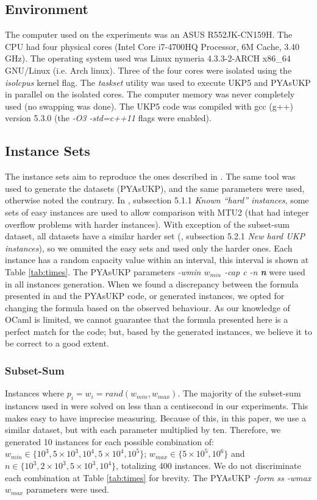 \documentclass[runningheads,a4paper]{llncs}
\begin{document}
\subsection{Environment}

The computer used on the experiments was an ASUS R552JK-CN159H. The CPU had four physical cores (Intel Core i7-4700HQ Processor, 6M Cache, 3.40 GHz). The operating system used was Linux nymeria 4.3.3-2-ARCH x86\_64 GNU/Linux (i.e. Arch linux). Three of the four cores were isolated using the \emph{isolcpus} kernel flag. The \emph{taskset} utility was used to execute UKP5 and PYAsUKP in parallel on the isolated cores. The computer memory was never completely used (no swapping was done). The UKP5 code was compiled with gcc (g++) version 5.3.0 (the \emph{-O3 -std=c++11} flags were enabled).

\subsection{Instance Sets}

The instance sets aim to reproduce the ones described in \cite{pya}. The same tool was used to generate the datasets (PYAsUKP), and the same parameters were used, otherwise noted the contrary. In \cite{pya}, subsection 5.1.1 \emph{Known ``hard'' instances}, some sets of easy instances are used to allow comparison with MTU2 (that had integer overflow problems with harder instances). With exception of the subset-sum dataset, all datasets have a similar harder set (\cite{pya}, subsection 5.2.1 \emph{New hard UKP instances}), so we ommited the easy sets and used only the harder ones. Each instance has a random capacity value within an interval, this interval is shown at Table \ref{tab:times}. The PYAsUKP parameters \emph{-wmin \(w_{min}\) -cap c -n \textbf{n}} were used in all instances generation. When we found a discrepancy between the formula presented in \cite{pya} and the PYAsUKP code, or generated instances, we opted for changing the formula based on the observed behaviour. As our knowledge of OCaml is limited, we cannot guarantee that the formula presented here is a perfect match for the code; but, based by the generated instances, we believe it to be correct to a good extent.

\subsubsection{Subset-Sum}\label{sec:subsetsum}
Instances where \(p_i = w_i = rand(w_{min}, w_{max})\). The majority of the subset-sum instances used in \cite{pya} were solved on less than a centisecond in our experiments. This makes easy to have imprecise measuring. Because of this, in this paper, we use a similar dataset, but with each parameter multiplied by ten. Therefore, we generated 10 instances for each possible combination of: \(w_{min} \in \{10^3, 5\times10^3, 10^4, 5\times10^4, 10^5\}\); \(w_{max} \in \{5\times10^5, 10^6\}\) and \(n \in \{10^3, 2\times10^3, 5\times10^3, 10^4\}\), totalizing 400 instances. We do not discriminate each combination at Table \ref{tab:times} for brevity. The PYAsUKP \emph{-form ss -wmax \(w_{max}\)} parameters were used.
\end{document}
